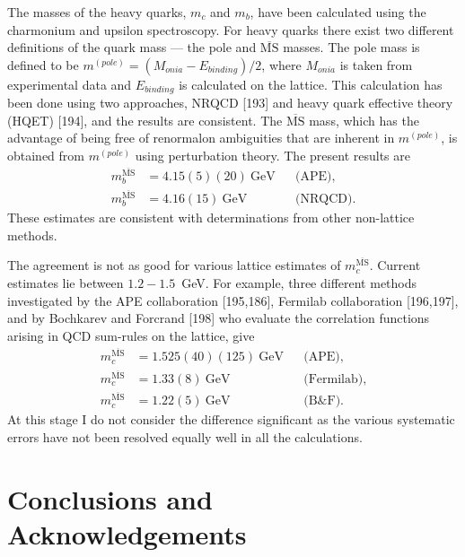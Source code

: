 The masses of the heavy quarks, $m_c$ and $m_b$, have been calculated using the charmonium and upsilon spectroscopy. For heavy quarks there exist two different definitions of the quark mass --- the pole and $\overline{\mathrm{MS}}$ masses. The pole mass is defined to be $m^{(pole)} = (M_{onia} - E_{binding})/2$, where $M_{onia}$ is taken from experimental data and $E_{binding}$ is calculated on the lattice. This calculation has been done using two approaches, NRQCD [193] and heavy quark effective theory (HQET) [194], and the results are consistent. The $\overline{\mathrm{MS}}$ mass, which has the advantage of being free of renormalon ambiguities that are inherent in $m^{(pole)}$, is obtained from $m^{(pole)}$ using perturbation theory. The present results are
\begin{equation}
\begin{aligned}
m_b^{\overline{\mathrm{MS}}} &= 4.15(5)(20)~\mathrm{GeV} && \text{(APE)}, \\
m_b^{\overline{\mathrm{MS}}} &= 4.16(15)~\mathrm{GeV} && \text{(NRQCD)}.
\end{aligned}
\end{equation}
These estimates are consistent with determinations from other non-lattice methods.

The agreement is not as good for various lattice estimates of $m_c^{\overline{\mathrm{MS}}}$. Current estimates lie between $1.2 - 1.5$~GeV. For example, three different methods investigated by the APE collaboration [195,186], Fermilab collaboration [196,197], and by Bochkarev and Forcrand [198] who evaluate the correlation functions arising in QCD sum-rules on the lattice, give
\begin{equation}
\begin{aligned}
m_c^{\overline{\mathrm{MS}}} &= 1.525(40)(125)~\mathrm{GeV} && \text{(APE)}, \\
m_c^{\overline{\mathrm{MS}}} &= 1.33(8)~\mathrm{GeV} && \text{(Fermilab)}, \\
m_c^{\overline{\mathrm{MS}}} &= 1.22(5)~\mathrm{GeV} && \text{(B\&F)}.
\end{aligned}
\end{equation}
At this stage I do not consider the difference significant as the various systematic errors have not been resolved equally well in all the calculations.

\section*{Conclusions and Acknowledgements}

